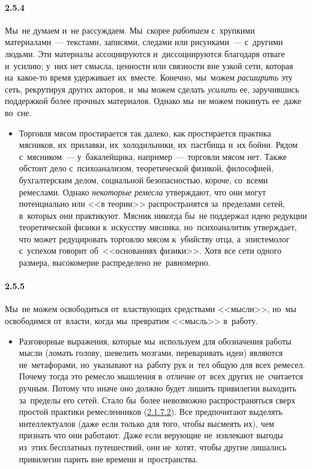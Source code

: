 \paragraph{2.5.4}\hypertarget{par:2.5.4}{} Мы~не думаем и~не рассуждаем. Мы~скорее {\itshape работаем} с~хрупкими материалами~--- текстами, записями, следами или рисунками~--- с~другими людьми. Эти материалы ассоциируются и~диссоциируются благодаря отваге и~усилию; у~них нет смысла, ценности или связности вне узкой сети, которая на~какое-то время удерживает их~вместе. Конечно, мы~можем {\itshape расширить} эту сеть, рекрутируя других акторов, и~мы можем сделать {\itshape усилить} ее, заручившись поддержкой более прочных материалов. Однако мы~не можем покинуть ее~даже во~сне.
	\begin{itemize}
	\item 
	Торговля мясом простирается так далеко, как простирается практика мясников, их~прилавки, их~холодильники, их~пастбища и~их бойни. Рядом с~мясником~--- у~бакалейщика, например~--- торговли мясом нет. Также обстоит дело с~психоанализом, теоретической физикой, философией, бухгалтерским делом, социальной безопасностью, короче, со~всеми ремеслами. Однако {\itshape некоторые ремесла }утверждают, что они могут потенциально или <<в теории>> распространятся за~пределами сетей, в~которых они практикуют. Мясник никогда бы~не поддержал идею редукции теоретической физики к~искусству мясника, но~психоаналитик утверждает, что может редуцировать торговлю мясом к~убийству отца, а~эпистемолог с~успехом говорит об~<<основаниях физики>>. Хотя все сети одного размера, высокомерие распределено не~равномерно.
	\end{itemize}

\paragraph{2.5.5}\hypertarget{par:2.5.5}{} Мы~не можем освободиться от~властвующих средствами <<мысли>>, но~мы освободимся от~власти, когда мы~превратим <<мысль>> в~работу. 
	\begin{itemize}
	\item 
	Разговорные выражения, которые мы~используем для обозначения работы мысли (ломать голову, шевелить мозгами, переваривать идеи) являются не~метафорами, но~указывают на~работу рук и~тел общую для всех ремесел. Почему тогда это ремесло мышления в~отличие от~всех других не~считается ручным. Потому что иначе оно должно будет лишить привилегии выходить за~пределы его сетей. Стало бы~более невозможно распространяться сверх простой практики ремесленников (\hyperlink{par:2.1.7.2}{2.1.7.2}). Все предпочитают выделять интеллектуалов (даже если только для того, чтобы высмеять их), чем признать что они работают. Даже если верующие не~извлекают выгоды из~этих бесплатных путешествий, они не~хотят, чтобы другие лишались привилегии парить вне времени и~пространства.
	\end{itemize}

